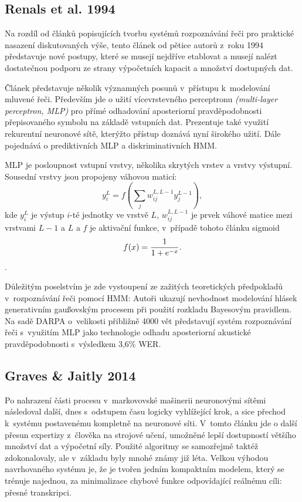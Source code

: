 \subsection{Renals et al. 1994}

Na rozdíl od článků popisujících tvorbu systémů rozpoznávání řeči pro praktické
nasazení diskutovaných výše, tento článek od pětice autorů z~roku
1994\cite{renals1994connectionist} představuje nové postupy, které se musejí
nejdříve etablovat a musejí nalézt dostatečnou podporu ze strany výpočetních
kapacit a množství dostupných dat.

Článek představuje několik významných posunů v~přístupu k~modelování mluvené
řeči. Především jde o užití vícevrstevného perceptronu \textit{(multi-layer
perceptron, MLP)} pro přímé odhadování aposteriorní pravděpodobnosti
přepisovaného symbolu na základě vstupních dat. Prezentuje také využití
rekurentní neuronové sítě, kterýžto přístup doznává nyní širokého užití. Dále
pojednává o prediktivních MLP a diskriminativních HMM.

MLP je posloupnost vstupní vrstvy, několika skrytých vrstev a vrstvy výstupní.
Sousední vrstvy jsou propojeny váhovou maticí:
\begin{equation}
y_i^L = f(\sum_j w_{ij}^{L,L-1}y_j^{L-1}),
\end{equation}
kde $y_i^L$ je výstup $i$-té jednotky ve vrstvě $L$,
$w_{ij}^{L,L-1}$ je prvek váhové matice mezi vrstvami $L - 1$ a $L$
a $f$ je aktivační funkce, v~případě tohoto článku sigmoid
\begin{equation}
f(x) = {{1}\over{1 + e^{-x}}}.
\end{equation}.

Důležitým poselstvím je zde vystoupení ze zažitých teoretických předpokladů
v~rozpoznávání řeči pomocí HMM: Autoři ukazují nevhodnost modelování hlásek
generativním gaußovským procesem při použití rozkladu Bayesovým pravidlem.
Na sadě DARPA o~velikosti přibližně 4000 vět představují systém rozpoznávání
řeči s~využitím MLP jako technologie odhadu aposteriorní akustické
pravděpodobnosti s~výsledkem 3,6\% WER.

\subsection{Graves \& Jaitly 2014}

Po nahrazení části procesu v~markovovské mašinerii neuronovými sítěmi následoval
další, dnes s~odstupem času logicky vyhlížející krok, a sice přechod k~systému
postavenému kompletně na neuronové síti. V~tomto článku\cite{graves2014towards}
jde o další přesun expertizy z~člověka na strojové učení, umožněné lepší
dostupností většího množství dat a výpočetní síly. Použité algoritmy se
samozřejmě taktéž zdokonalovaly, ale v~základu byly mnohé známy již léta. Velkou
výhodou navrhovaného systému je, že je tvořen jedním kompaktním modelem, který
se trénuje najednou, za minimalizace chybové funkce odpovídající reálnému cíli:
přesné transkripci.


